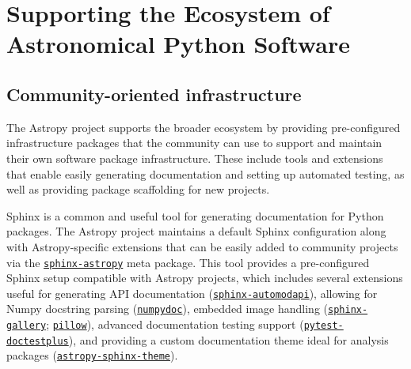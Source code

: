 \documentclass[modern]{aastex631}
\newcommand{\secauthor}[1]{{\color{blue}Author:~\textit{#1}}}
\begin{document}

\section{Supporting the Ecosystem of Astronomical Python Software}
\label{sec:ecosystem}

\subsection{Community-oriented infrastructure}


The Astropy project supports the broader ecosystem by providing pre-configured
infrastructure packages that the community can use to support and maintain their
own software package infrastructure. These include tools and extensions that
enable easily generating documentation and setting up automated testing, as well
as providing package scaffolding for new projects.

Sphinx is a common and useful tool for generating documentation for Python
packages. The Astropy project maintains a default Sphinx configuration along
with Astropy-specific extensions that can be easily added to community
projects via the
\href{https://github.com/astropy/sphinx-astropy}{\texttt{sphinx-astropy}} meta
package. This tool provides a pre-configured Sphinx setup compatible with
Astropy projects, which includes several extensions useful for generating API
documentation
(\href{https://github.com/astropy/sphinx-automodapi}{\texttt{sphinx-automodapi}}),
allowing for Numpy docstring parsing
(\href{https://github.com/numpy/numpydoc}{\texttt{numpydoc}}), embedded image
handling
(\href{https://github.com/sphinx-gallery/sphinx-gallery}{\texttt{sphinx-gallery}};
\href{https://github.com/python-pillow}{\texttt{pillow}}), advanced
documentation testing support
(\href{https://github.com/astropy/pytest-doctestplus}{\texttt{pytest-doctestplus}}),
and providing a custom documentation theme ideal for analysis packages
(\href{https://github.com/astropy/sphinx-astropy}{\texttt{astropy-sphinx-theme}}).
\end{document}
